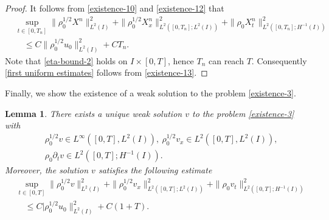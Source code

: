 \documentclass[11pt, reqno]{amsart}
\newtheorem{lemma}{Lemma}
\numberwithin{equation}{section}
\begin{document}
{\begin{proof}
It follows from \eqref{existence-10} and \eqref{existence-12} that
\begin{equation}\label{existence-13}
	\begin{aligned}
		&\underset{t\in[0,T_n]}{\sup}\|\rho_0^{1/2}X^n\|_{L^2(I)}^2
		+\|\rho_0^{1/2}X_x^n\|_{L^2([0,T_n];L^2(I))}^2+\|\rho_0 X_t^n\|_{L^2([0,T_n];H^{-1}(I))}^2\\
		&\quad\leq C\|\rho_0^{1/2}u_0\|_{L^2(I)}^2+CT_n.
	\end{aligned}
\end{equation}
Note that \eqref{eta-bound-2} holds on \(I\times[0,T]\), hence \(T_n\) can reach \(T\).  Consequently \eqref{first uniform estimates} follows from \eqref{existence-13}.

\end{proof}



Finally, we show the existence of a weak solution to the problem \eqref{existence-3}. 

\begin{lemma} There exists a unique weak solution \(v\) to the problem \eqref{existence-3} with
	\begin{equation*}
		\begin{aligned}
			&\rho_0^{1/2}v\in L^\infty([0,T],L^2(I)),\ \rho_0^{1/2}v_x\in L^2([0,T],L^2(I)),\\
			&\rho_0\partial_tv\in L^2([0,T];H^{-1}(I)).
		\end{aligned}
	\end{equation*}	
	Moreover, the solution \(v\) satisfies the following estimate	
	\begin{equation}\label{solution bound}
		\begin{aligned}
			&\underset{t\in[0,T]}{\sup}\|\rho_0^{1/2}v\|_{L^2(I)}^2
			+\|\rho_0^{1/2}v_x\|_{L^2([0,T];L^2(I))}^2
			+\|\rho_0v_t\|_{L^2([0,T];H^{-1}(I))}^2\\
			&\quad\leq C|\rho_0^{1/2}u_0\|_{L^2(I)}^2+C(1+T).
		\end{aligned}
	\end{equation}	
	
\end{lemma}

}
\end{document}
